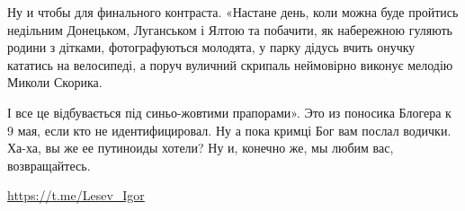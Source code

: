 Ну и чтобы для финального контраста. «Настане день, коли можна буде пройтись
недільним Донецьком, Луганськом і Ялтою та побачити, як набережною гуляють
родини з дітками, фотографуються молодята, у парку дідусь вчить онучку кататись
на велосипеді, а поруч вуличний скрипаль неймовірно виконує мелодію Миколи
Скорика.

І все це відбувається під синьо-жовтими прапорами». Это из поносика Блогера к 9
мая, если кто не идентифицировал. Ну а пока кримці Бог вам послал водички.
Ха-ха, вы же ее путиноиды хотели? Ну и, конечно же, мы любим вас,
возвращайтесь.

\url{https://t.me/Lesev_Igor}


